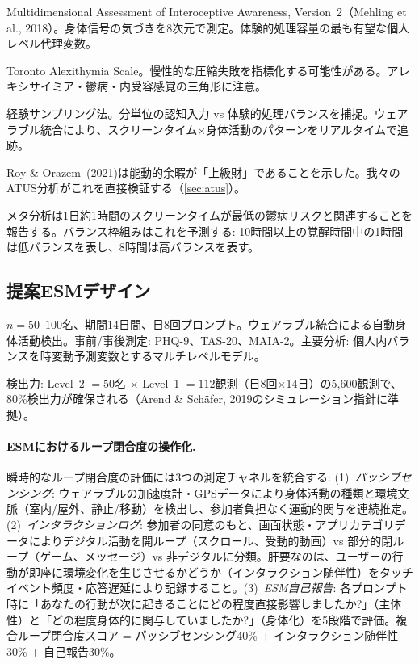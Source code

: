 \documentclass[a4paper,11pt,titlepage]{article}
\begin{document}
\begin{description}[leftmargin=2em]
\item[MAIA-2] Multidimensional Assessment of Interoceptive Awareness, Version~2（Mehling et al., 2018）。身体信号の気づきを8次元で測定。体験的処理容量の最も有望な個人レベル代理変数。
\item[TAS-20] Toronto Alexithymia Scale。慢性的な圧縮失敗を指標化する可能性がある。アレキシサイミア・鬱病・内受容感覚の三角形に注意。
\item[ESM] 経験サンプリング法。分単位の認知入力 vs 体験的処理バランスを捕捉。ウェアラブル統合により、スクリーンタイム$\times$身体活動のパターンをリアルタイムで追跡。
\item[ATUS能動的/受動的余暇] Roy \& Orazem~(2021)は能動的余暇が「上級財」であることを示した。我々のATUS分析がこれを直接検証する（\cref{sec:atus}）。
\item[非線形用量反応] メタ分析は1日約1時間のスクリーンタイムが最低の鬱病リスクと関連することを報告する。バランス枠組みはこれを予測する: 10時間以上の覚醒時間中の1時間は低バランスを表し、8時間は高バランスを表す。
\end{description}

\subsection{提案ESMデザイン}

$n = 50$--$100$名、期間14日間、日8回プロンプト。ウェアラブル統合による自動身体活動検出。事前/事後測定: PHQ-9、TAS-20、MAIA-2。主要分析: 個人内バランスを時変動予測変数とするマルチレベルモデル。

検出力: Level~2 $= 50$名 $\times$ Level~1 $= 112$観測（日8回$\times$14日）の5,600観測で、80\%検出力が確保される（Arend \& Schäfer, 2019のシミュレーション指針に準拠）。

\paragraph{ESMにおけるループ閉合度の操作化.}
瞬時的なループ閉合度の評価には3つの測定チャネルを統合する: (1)~\textit{パッシブセンシング}: ウェアラブルの加速度計・GPSデータにより身体活動の種類と環境文脈（室内/屋外、静止/移動）を検出し、参加者負担なく運動的関与を連続推定。(2)~\textit{インタラクションログ}: 参加者の同意のもと、画面状態・アプリカテゴリデータによりデジタル活動を開ループ（スクロール、受動的動画）vs 部分的閉ループ（ゲーム、メッセージ）vs 非デジタルに分類。肝要なのは、ユーザーの行動が即座に環境変化を生じさせるかどうか（インタラクション随伴性）をタッチイベント頻度・応答遅延により記録すること。(3)~\textit{ESM自己報告}: 各プロンプト時に「あなたの行動が次に起きることにどの程度直接影響しましたか?」（主体性）と「どの程度身体的に関与していましたか?」（身体化）を5段階で評価。複合ループ閉合度スコア = パッシブセンシング40\% + インタラクション随伴性30\% + 自己報告30\%。
\end{document}
